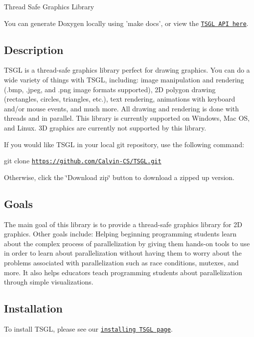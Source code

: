 Thread Safe Graphics Library

You can generate Doxygen locally using 'make docs', or view the \href{http://calvin-cs.github.io/TSGL/html/index.html}{\tt T\-S\-G\-L A\-P\-I here}. 

 \subsection*{Description }

T\-S\-G\-L is a thread-\/safe graphics library perfect for drawing graphics. You can do a wide variety of things with T\-S\-G\-L, including\-: image manipulation and rendering (.bmp, .jpeg, and .png image formats supported), 2\-D polygon drawing (rectangles, circles, triangles, etc.), text rendering, animations with keyboard and/or mouse events, and much more. All drawing and rendering is done with threads and in parallel. This library is currently supported on Windows, Mac O\-S, and Linux. 3\-D graphics are currently not supported by this library.

If you would like T\-S\-G\-L in your local git repository, use the following command\-:

git clone \href{https://github.com/Calvin-CS/TSGL.git}{\tt https\-://github.\-com/\-Calvin-\/\-C\-S/\-T\-S\-G\-L.\-git}

Otherwise, click the \char`\"{}\-Download zip\char`\"{} button to download a zipped up version. 

 \subsection*{Goals }

The main goal of this library is to provide a thread-\/safe graphics library for 2\-D graphics. Other goals include\-: Helping beginning programming students learn about the complex process of parallelization by giving them hands-\/on tools to use in order to learn about parallelization without having them to worry about the problems associated with parallelization such as race conditions, mutexes, and more. It also helps educators teach programming students about parallelization through simple visualizations. 

 \subsection*{Installation }

To install T\-S\-G\-L, please see our \href{https://github.com/Calvin-CS/TSGL/wiki/Installing-TSGL}{\tt installing T\-S\-G\-L page}. 

